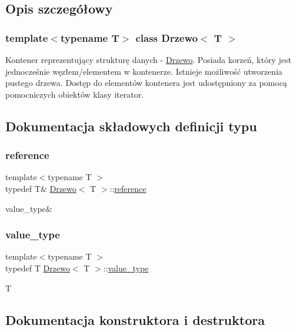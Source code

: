 \subsection{Opis szczegółowy}
\subsubsection*{template$<$typename T$>$\newline
class Drzewo$<$ T $>$}

Kontener reprezentujący strukturę danych -\/ \hyperlink{class_drzewo}{Drzewo}. Posiada korzeń, który jest jednocześnie węzłem/elementem w kontenerze. Istnieje możliwość utworzenia pustego drzewa. Dostęp do elementów kontenera jest udostępniony za pomocą pomocniczych obiektów klasy iterator. 

\subsection{Dokumentacja składowych definicji typu}
\mbox{\label{class_drzewo_ad9689c01b3f07d1601e199799fcc1705}} 
\subsubsection{\texorpdfstring{reference}{reference}}
{\footnotesize\ttfamily template$<$typename T $>$ \\
typedef T\& \hyperlink{class_drzewo}{Drzewo}$<$ T $>$\+::\hyperlink{class_drzewo_ad9689c01b3f07d1601e199799fcc1705}{reference}}

value\+\_\+type\& \mbox{\label{class_drzewo_a349719391d8470c24d68e8a4f0fecf3c}} 
\subsubsection{\texorpdfstring{value\+\_\+type}{value\_type}}
{\footnotesize\ttfamily template$<$typename T $>$ \\
typedef T \hyperlink{class_drzewo}{Drzewo}$<$ T $>$\+::\hyperlink{class_drzewo_a349719391d8470c24d68e8a4f0fecf3c}{value\+\_\+type}}

T 

\subsection{Dokumentacja konstruktora i destruktora}
\mbox{\label{class_drzewo_a9b87f8101458fea6c866ffd01efa9ef6}} 
